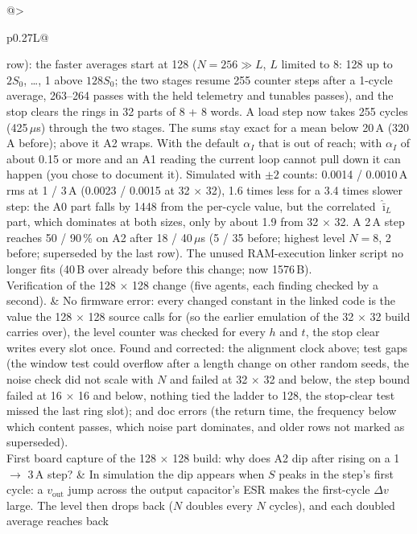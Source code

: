 \documentclass[11pt]{article}
\begin{document}
{\begin{xltabular}{\linewidth}{@{}>{\raggedright\arraybackslash}p{0.27\linewidth}L@{}}
    row): the faster averages start at 128
    ($N=256\gg L$, $L$ limited to 8: 128 up to $2S_0$, \dots, 1 above
    $128S_0$; the two stages resume 255 counter steps after a 1-cycle
    average, 263--264 passes with the held telemetry and tunables passes),
    and the stop clears the rings in 32 parts of 8 + 8 words. A load step
    now takes 255 cycles (425\,$\mu$s) through the two stages. The sums
    stay exact for a mean below 20\,A (320\,A before); above it A2
    wraps. With the default $\alpha_I$ that is out of reach; with
    $\alpha_I$ of about 0.15 or more and an A1 reading the current loop
    cannot pull down it can happen (you chose to document it). Simulated
    with $\pm2$ counts: 0.0014 / 0.0010\,A rms at 1 / 3\,A (0.0023 /
    0.0015 at 32 $\times$ 32), 1.6 times less for a 3.4 times slower step:
    the A0 part falls by 1448 from the per-cycle value, but the correlated
    $\hat{\bar{\imath}}_L$ part, which dominates at both sizes, only by
    about 1.9 from 32 $\times$ 32. A 2\,A step reaches 50 / 90\,\% on A2
    after 18 / 40\,$\mu$s (5 / 35 before; highest level $N=8$, 2 before;
    superseded by the last row).
    The unused RAM-execution linker script no longer fits (40\,B over
    already before this change; now 1576\,B). \\
Verification of the 128 $\times$ 128 change (five agents, each finding
checked by a second).
  & No firmware error: every changed constant in the linked code is the
    value the 128 $\times$ 128 source calls for (so the earlier emulation
    of the 32 $\times$ 32 build carries over), the level counter was
    checked for every $h$ and $t$, the stop clear writes every slot
    once. Found and corrected: the alignment clock above; test gaps (the
    window test could overflow after a length change on other random
    seeds, the noise check did not scale with $N$ and failed at 32
    $\times$ 32 and below, the step bound failed at 16 $\times$ 16 and
    below, nothing tied the ladder to 128, the stop-clear test missed
    the last ring slot); and doc errors (the return time, the
    frequency below which content passes, which noise part dominates,
    and older rows not marked as superseded). \\
First board capture of the 128 $\times$ 128 build: why does A2 dip after
rising on a 1 $\to$ 3\,A step?
  & In simulation the dip appears when $S$ peaks in the step's first
    cycle: a $v_\mathrm{out}$ jump across the output capacitor's ESR
    makes the first-cycle $\Delta v$ large. The level then drops back
    ($N$ doubles every $N$ cycles), and each doubled average reaches back

\end{xltabular}}
\end{document}

